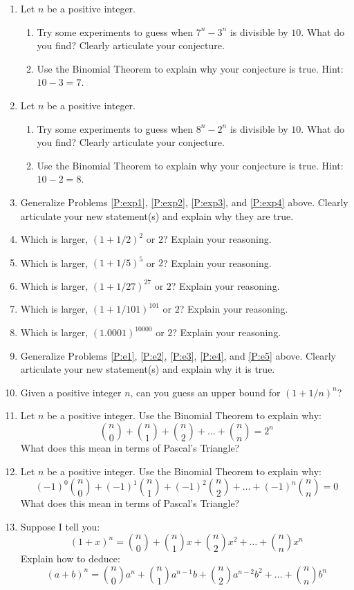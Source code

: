 \begin{problems}
\begin{enumerate}
\item\label{P:exp3} Let $n$ be a positive integer.
\begin{enumerate}
\item Try some experiments to guess when $7^n - 3^n$ is divisible by
  $10$. What do you find? Clearly articulate your conjecture.
\item Use the Binomial Theorem to explain why your conjecture is
  true. Hint: $10-3 = 7$.
\end{enumerate}
\item\label{P:exp4} Let $n$ be a positive integer.
\begin{enumerate}
\item Try some experiments to guess when $8^n - 2^n$ is divisible by
  $10$. What do you find? Clearly articulate your conjecture.
\item Use the Binomial Theorem to explain why your conjecture is
  true. Hint: $10-2 = 8$.
\end{enumerate}
\item Generalize Problems \ref{P:exp1}, \ref{P:exp2}, \ref{P:exp3},
  and \ref{P:exp4} above. Clearly articulate your new statement(s) and
  explain why they are true.
\item\label{P:e1} Which is larger, $(1 + 1/2)^2$ or $2$? Explain your
  reasoning.
\item\label{P:e2} Which is larger, $(1 + 1/5)^5$ or $2$? Explain your
  reasoning.
\item\label{P:e3} Which is larger, $(1 + 1/27)^{27}$ or $2$? Explain
  your reasoning.
\item\label{P:e4} Which is larger, $(1 + 1/101)^{101}$ or $2$? Explain
  your reasoning.
\item\label{P:e5} Which is larger, $(1.0001)^{10000}$ or $2$? Explain
  your reasoning.
\item Generalize Problems \ref{P:e1}, \ref{P:e2}, \ref{P:e3},
  \ref{P:e4}, and \ref{P:e5} above. Clearly articulate your new
  statement(s) and explain why it is true.
\item Given a positive integer $n$, can you guess an upper bound for
  $(1 + 1/n)^{n}$?
\item Let $n$ be a positive integer. Use the Binomial Theorem to
  explain why:
\[
\binom{n}{0} + \binom{n}{1} + \binom{n}{2} + \dots + \binom{n}{n} = 2^n
\]
What does this mean in terms of Pascal's Triangle?
\item Let $n$ be a positive integer. Use the Binomial Theorem to
  explain why:
\[
(-1)^0\binom{n}{0} + (-1)^1\binom{n}{1} + (-1)^2\binom{n}{2} + \dots + (-1)^n\binom{n}{n} = 0
\]
What does this mean in terms of Pascal's Triangle?
\item Suppose I tell you:
\[
(1+x)^n = \binom{n}{0} + \binom{n}{1}x + \binom{n}{2}x^2+\dots +
\binom{n}{n}x^n
\]
Explain how to deduce:
\[
(a+b)^n = \binom{n}{0}a^n + \binom{n}{1}a^{n-1}b +
\binom{n}{2}a^{n-2}b^2+\dots + \binom{n}{n}b^n
\]
\end{enumerate}
\end{problems}



